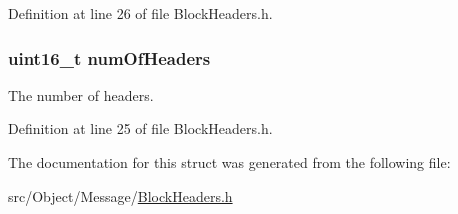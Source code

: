Definition at line 26 of file BlockHeaders.h.

\hypertarget{struct_block_headers_a9cfb2de0666e1e88b621171a97ba801e}{
\subsubsection[{numOfHeaders}]{\setlength{\rightskip}{0pt plus 5cm}uint16\_\-t {\bf numOfHeaders}}}
\label{struct_block_headers_a9cfb2de0666e1e88b621171a97ba801e}
The number of headers. 

Definition at line 25 of file BlockHeaders.h.



The documentation for this struct was generated from the following file:\begin{DoxyCompactItemize}
\item 
src/Object/Message/\hyperlink{_block_headers_8h}{BlockHeaders.h}\end{DoxyCompactItemize}
